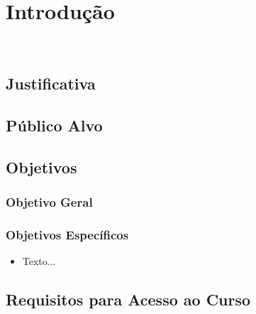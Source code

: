 \documentclass[11pt,fleqn]{book} %
\begin{document}

\chapter{Introdução}
\vspace{6em}
\begin{flushright}
	\textit{\textcolor{white}{Foto: Adriano Darosci}}
\end{flushright}
\vspace{12em}


\section{Justificativa}


\section{Público Alvo}


\section{Objetivos}\label{objetivos}
\subsection{Objetivo Geral}


\subsection{Objetivos Específicos}
\begin{itemize}
\item Texto... 
\end{itemize}

\section{Requisitos para Acesso ao Curso}

\end{document}
